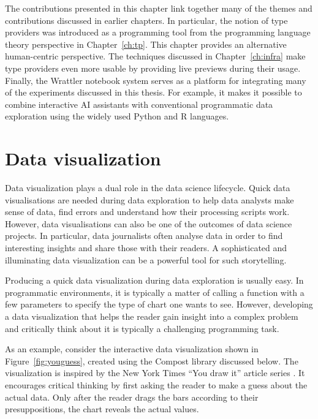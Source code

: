 \documentclass[fleqn,11pt]{report}
\theoremstyle{definition}
\begin{document}
The contributions presented in this chapter link together many of the themes and contributions
discussed in earlier chapters. In particular, the notion of type providers was introduced
as a programming tool from the programming language theory perspective in Chapter~\ref{ch:tp}.
This chapter provides an alternative human-centric perspective. The techniques discussed
in Chapter~\ref{ch:infra} make type providers even more usable by providing live previews during
their usage. Finally, the Wrattler notebook system serves as a platform for integrating
many of the experiments discussed in this thesis. For example, it makes it possible to combine
interactive AI assistants with conventional programmatic data exploration using the widely
used Python and R languages.



\chapter{Data visualization}

Data visualization plays a dual role in the data science lifecycle. Quick data
visualisations are needed during data exploration to help data analysts make sense of
data, find errors and understand how their processing scripts work. However, data visualisations
can also be one of the outcomes of data science projects. In particular, data journalists
often analyse data in order to find interesting insights and share those with their readers.
A sophisticated and illuminating data visualization can be a powerful tool for such storytelling.

Producing a quick data visualization during data exploration is usually easy. In programmatic
environments, it is typically a matter of calling a function with a few parameters to specify
the type of chart one wants to see. However, developing a data visualization that helps
the reader gain insight into a complex problem and critically think about it is typically
a challenging programming task.

As an example, consider the interactive data visualization shown in Figure~\ref{fig:youguess},
created using the Compost library discussed below. The visualization is inspired by the New York
Times ``You draw it'' article series \citep{aisch-2015-youdraw}.
It encourages critical thinking by first asking the reader to make a guess
about the actual data. Only after the reader drags the bars according to their presuppositions, the
chart reveals the actual values.
\end{document}
